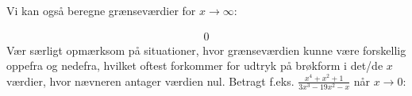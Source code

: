\documentclass[letterpaper,10pt,english]{jupyterBook}
\begin{document}
Vi kan også beregne grænseværdier for \(x\to\infty\):

\begin{sphinxVerbatim}[commandchars=\\\{\}]
      
\end{sphinxVerbatim}
\begin{equation*}
\begin{split}\displaystyle 0\end{split}
\end{equation*}
Vær særligt opmærksom på situationer, hvor grænseværdien kunne være forskellig oppefra og nedefra, hvilket oftest forkommer for udtryk på brøkform i det/de \(x\)\sphinxhyphen{}værdier, hvor nævneren antager værdien nul. Betragt f.eks. \(\displaystyle \frac{x^{4} + x^{2} + 1}{3 x^{3} - 19 x^{2} - x}\) når \(x \to 0\):
\end{document}
